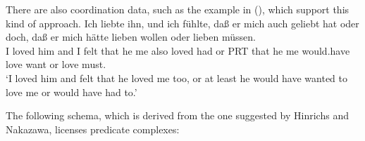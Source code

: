 {{There are also coordination data, such as the example in (), which support this kind of approach.
\ea
\gll Ich liebte ihn, und ich fühlte, daß er mich auch geliebt hat oder doch, daß er mich hätte lieben wollen oder lieben müssen.\footnotemark\\
     I   loved  him and I felt that he me also loved had or PRT that he me   would.have love want or love must.\\
\glt `I loved him and felt that he loved me too, or at least he would have wanted to love me or would have had to.'
\z

The following schema, which is derived from the one suggested by Hinrichs and Nakazawa, licenses
predicate complexes:

\begin{samepage}
\begin{schema}
\label{schema-vk}
~\\
 \impl\\
\end{schema}
\end{samepage}
%

}}
